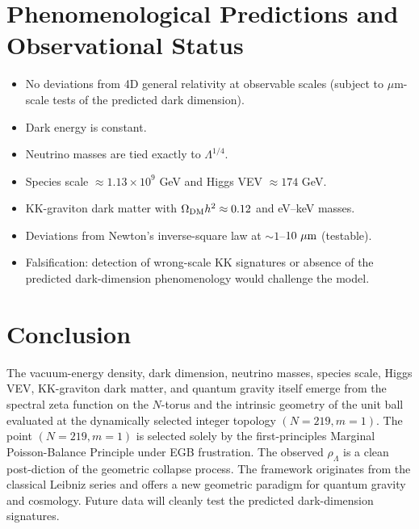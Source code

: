\documentclass[12pt,a4paper]{article}
\begin{document}
\section{Phenomenological Predictions and Observational Status}
\begin{itemize}
\item No deviations from 4D general relativity at observable scales (subject to \(\mu\)m-scale tests of the predicted dark dimension).
\item Dark energy is constant.
\item Neutrino masses are tied exactly to \(\Lambda^{1/4}\).
\item Species scale \(\approx 1.13 \times 10^9\) GeV and Higgs VEV \(\approx 174\) GeV.
\item KK-graviton dark matter with \(\Omega_{\rm DM} h^2 \approx 0.12\) and eV--keV masses.
\item Deviations from Newton’s inverse-square law at \(\sim 1\)--\(10\ \mu{\rm m}\) (testable).
\item Falsification: detection of wrong-scale KK signatures or absence of the predicted dark-dimension phenomenology would challenge the model.
\end{itemize}

\section{Conclusion}
The vacuum-energy density, dark dimension, neutrino masses, species scale, Higgs VEV, KK-graviton dark matter, and quantum gravity itself emerge from the spectral zeta function on the \(N\)-torus and the intrinsic geometry of the unit ball evaluated at the dynamically selected integer topology \((N=219,m=1)\). The point \((N=219,m=1)\) is selected solely by the first-principles Marginal Poisson-Balance Principle under EGB frustration. The observed \(\rho_\Lambda\) is a clean post-diction of the geometric collapse process. The framework originates from the classical Leibniz series and offers a new geometric paradigm for quantum gravity and cosmology. Future data will cleanly test the predicted dark-dimension signatures.
\end{document}
